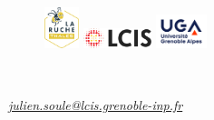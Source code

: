 \begin{frame}[plain]
    \maketitle\vspace{-0.8cm}
    \begin{figure}[ht!]
        \centering

        \centering
        \begin{minipage}{0.25\textwidth}
            \centering
            
        \end{minipage}\hfill
        \begin{minipage}{0.25\textwidth}
            \centering
            \includegraphics[height=1.2cm]{figures/la-ruche_logo.png}
        \end{minipage}\hfill
        \begin{minipage}{0.25\textwidth}
            \centering
            \includegraphics[height=0.6cm]{figures/lcis_logo.png}
        \end{minipage}\hfill
        \begin{minipage}{0.25\textwidth}
            \centering
            \includegraphics[height=1cm]{figures/uga_logo.jpg}
        \end{minipage}

    \end{figure}

    \ \\

    \begin{minipage}{\textwidth}
        \centering
        \textit{\href{mailto:julien.soule@lcis.grenoble-inp.fr}{julien.soule@lcis.grenoble-inp.fr}}
    \end{minipage}


\end{frame}
